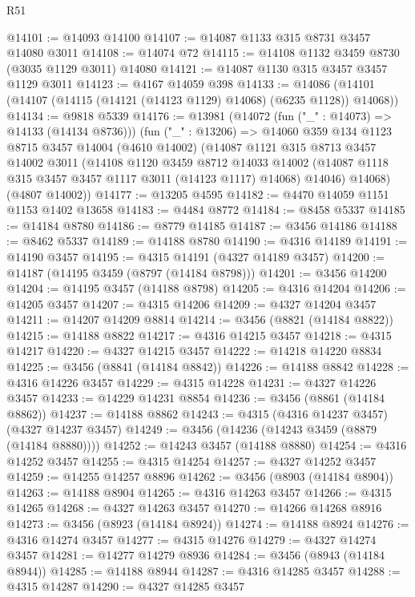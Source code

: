 \begin{lexlean}{R51}
\begin{coremodule}
@14101 := @14093 @14100
@14107 := @14087 @1133 @315 @8731 @3457 @14080 @3011
@14108 := @14074 @72
@14115 := @14108 @1132 @3459 @8730 (@3035 @1129 @3011) @14080
@14121 := @14087 @1130 @315 @3457 @3457 @1129 @3011
@14123 := @4167 @14059 @398
@14133 := @14086 (@14101 (@14107 (@14115 (@14121 (@14123 @1129) @14068) (@6235 @1128)) @14068))
@14134 := @9818 @5339
@14176 := @13981
    (@14072 (fun ("_" : @14073) => @14133 (@14134 @8736)))
    (fun ("_" : @13206) =>
    @14060
      @359
      @134
      @1123
      @8715
      @3457
      @14004
      (@4610 @14002)
      (@14087
        @1121
        @315
        @8713
        @3457
        @14002
        @3011
        (@14108
          @1120
          @3459
          @8712
          @14033
          @14002
          (@14087 @1118 @315 @3457 @3457 @1117 @3011 (@14123 @1117) @14068)
          @14046)
        @14068)
      (@4807 @14002))
@14177 := @13205 @4595
@14182 := @4470 @14059 @1151 @1153 @1402 @13658
@14183 := @4484 @8772
@14184 := @8458 @5337
@14185 := @14184 @8780
@14186 := @8779 @14185
@14187 := @3456 @14186
@14188 := @8462 @5337
@14189 := @14188 @8780
@14190 := @4316 @14189
@14191 := @14190 @3457
@14195 := @4315 @14191 (@4327 @14189 @3457)
@14200 := @14187 (@14195 @3459 (@8797 (@14184 @8798)))
@14201 := @3456 @14200
@14204 := @14195 @3457 (@14188 @8798)
@14205 := @4316 @14204
@14206 := @14205 @3457
@14207 := @4315 @14206
@14209 := @4327 @14204 @3457
@14211 := @14207 @14209 @8814
@14214 := @3456 (@8821 (@14184 @8822))
@14215 := @14188 @8822
@14217 := @4316 @14215 @3457
@14218 := @4315 @14217
@14220 := @4327 @14215 @3457
@14222 := @14218 @14220 @8834
@14225 := @3456 (@8841 (@14184 @8842))
@14226 := @14188 @8842
@14228 := @4316 @14226 @3457
@14229 := @4315 @14228
@14231 := @4327 @14226 @3457
@14233 := @14229 @14231 @8854
@14236 := @3456 (@8861 (@14184 @8862))
@14237 := @14188 @8862
@14243 := @4315 (@4316 @14237 @3457) (@4327 @14237 @3457)
@14249 := @3456 (@14236 (@14243 @3459 (@8879 (@14184 @8880))))
@14252 := @14243 @3457 (@14188 @8880)
@14254 := @4316 @14252 @3457
@14255 := @4315 @14254
@14257 := @4327 @14252 @3457
@14259 := @14255 @14257 @8896
@14262 := @3456 (@8903 (@14184 @8904))
@14263 := @14188 @8904
@14265 := @4316 @14263 @3457
@14266 := @4315 @14265
@14268 := @4327 @14263 @3457
@14270 := @14266 @14268 @8916
@14273 := @3456 (@8923 (@14184 @8924))
@14274 := @14188 @8924
@14276 := @4316 @14274 @3457
@14277 := @4315 @14276
@14279 := @4327 @14274 @3457
@14281 := @14277 @14279 @8936
@14284 := @3456 (@8943 (@14184 @8944))
@14285 := @14188 @8944
@14287 := @4316 @14285 @3457
@14288 := @4315 @14287
@14290 := @4327 @14285 @3457

\end{coremodule}
\end{lexlean}
